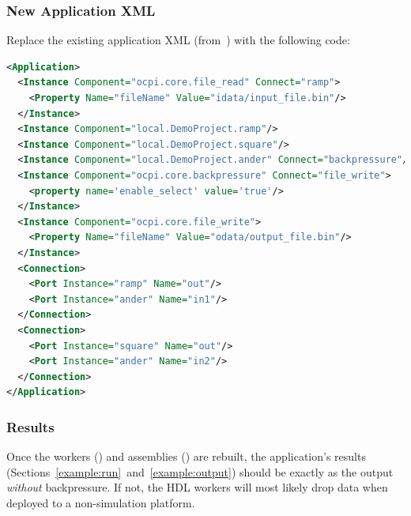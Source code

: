 \subsubsection*{New Application XML}
Replace the existing application XML (from~) with the following code:
\begin{lstlisting}[language=xml]
<Application>
  <Instance Component="ocpi.core.file_read" Connect="ramp">
    <Property Name="fileName" Value="idata/input_file.bin"/>
  </Instance>
  <Instance Component="local.DemoProject.ramp"/>
  <Instance Component="local.DemoProject.square"/>
  <Instance Component="local.DemoProject.ander" Connect="backpressure"/>
  <Instance Component="ocpi.core.backpressure" Connect="file_write">
    <property name='enable_select' value='true'/>
  </Instance>
  <Instance Component="ocpi.core.file_write">
    <Property Name="fileName" Value="odata/output_file.bin"/>
  </Instance>
  <Connection>
    <Port Instance="ramp" Name="out"/>
    <Port Instance="ander" Name="in1"/>
  </Connection>
  <Connection>
    <Port Instance="square" Name="out"/>
    <Port Instance="ander" Name="in2"/>
  </Connection>
</Application>
\end{lstlisting}
\bend
\bstart
\subsubsection*{Results}
Once the workers () and assemblies () are rebuilt, the application's results (Sections~\ref{example:run}~and~\ref{example:output}) should be exactly as the output \textit{without} backpressure. If not, the HDL workers will most likely drop data when deployed to a non-simulation platform.
\bend



